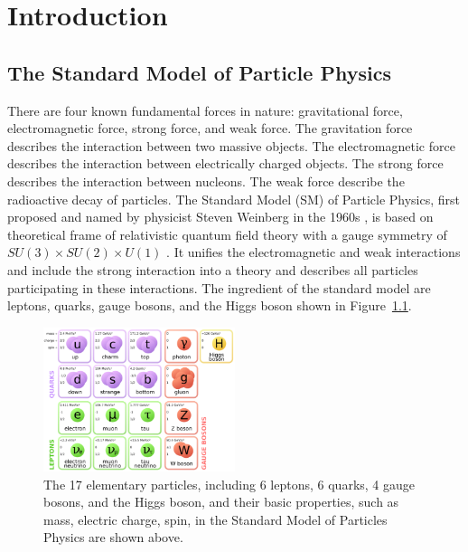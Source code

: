 
\chapter{Introduction}

\section{The Standard Model of Particle Physics}


There are four known fundamental forces in nature: gravitational force, electromagnetic force, strong force, and weak force. The gravitation force describes the interaction between two massive objects. The electromagnetic force describes the interaction between electrically charged objects. The strong force describes the interaction between nucleons. The weak force describe the radioactive decay of particles. The Standard Model (SM) of Particle Physics, first proposed and named by physicist Steven Weinberg in the 1960s \cite{StandardModel}, is based on theoretical frame of relativistic quantum field theory with a gauge symmetry of $SU(3) \times SU(2) \times U(1)$ \cite{SMTheory}. It unifies the electromagnetic and weak interactions and include the strong interaction into a theory and describes all particles participating in these interactions. The ingredient of the standard model are leptons, quarks, gauge bosons, and the Higgs boson shown in Figure~\ref{fig:SMParticle}.

\begin{figure}[hbtp]
\begin{center}
\includegraphics[width=0.50\textwidth]{Figures/Chapter1/SMParticles.png}
\caption{The 17 elementary particles, including 6 leptons, 6 quarks, 4 gauge bosons, and the Higgs boson, and their basic properties, such as mass, electric charge, spin, in the Standard Model of Particles Physics are shown above.}
\label{fig:SMParticle}
\end{center}
\end{figure} 


